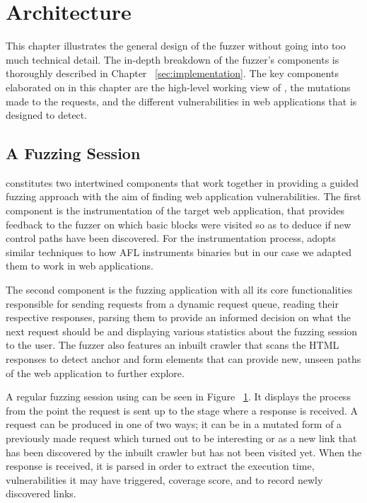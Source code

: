 \chapter{Architecture}
\label{sec:architecture}
\minitoc
\vspace*{1cm}

This chapter illustrates the general design of the fuzzer without going into too much technical detail. The in-depth breakdown of the fuzzer's components is thoroughly described in Chapter ~\ref{sec:implementation}. The key components elaborated on in this chapter are the high-level working view of \pname{}, the mutations made to the requests, and the different vulnerabilities in web applications that \pname{} is designed to detect.

\section{A Fuzzing Session}
\pname{} constitutes two intertwined components that work together in providing a guided fuzzing approach with the aim of finding web application vulnerabilities. The first
component is the instrumentation of the target web application, that provides feedback to the fuzzer on which basic blocks were visited so as to deduce if new control paths have been discovered. For the instrumentation process, \pname{} adopts similar techniques to how AFL instruments binaries but in our case we adapted them to work in web applications. 

The second component is the fuzzing application with all its core functionalities responsible for sending requests from a dynamic request queue, reading their respective responses, parsing them to provide an informed decision on what the next request should be and displaying various statistics about the fuzzing session to the user. The fuzzer also features an inbuilt crawler that scans the HTML responses to detect anchor and form elements that can provide new, unseen paths of the web application to further explore.

A regular fuzzing session using \pname{} can be seen in Figure ~\ref{sec:architecture}. It displays the process from the point the request is sent up to the stage where a response is received. A request can be produced in one of two ways; it can be in a mutated form of a previously made request which turned out to be interesting or as a new link that has been discovered by the inbuilt crawler but has not been visited yet. When the response is received, it is parsed in order to extract the execution time, vulnerabilities it may have triggered, coverage score, and to record newly discovered links.

